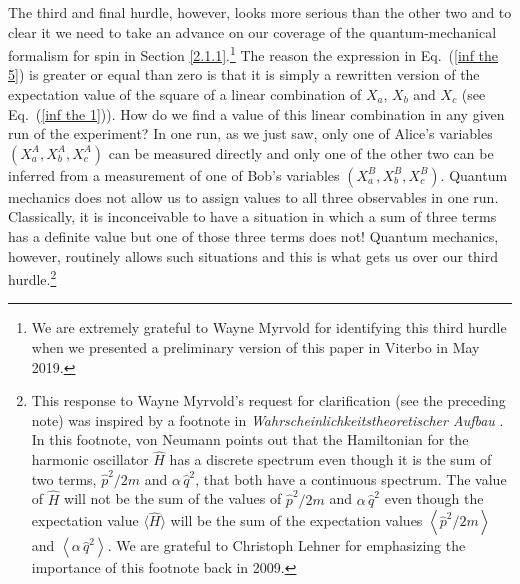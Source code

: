 The third and final hurdle, however, looks more serious than the other two and to clear it we need to take an advance on our coverage of  the quantum-mechanical formalism for spin in Section \ref{2.1.1}.\footnote{We are extremely grateful to Wayne Myrvold for identifying this third hurdle when we presented a preliminary version of this paper in Viterbo in May 2019.\label{Myrvold 1}} 
The reason the expression in Eq.\ (\ref{inf the 5}) is greater or equal than zero is that it is simply a rewritten version of the expectation value of the square of a linear combination of $X_a$, $X_b$ and $X_c$ (see Eq.\ (\ref{inf the 1})). How do we find a value of this linear combination in any given run of the experiment? In one run, as we just saw,
only one of Alice's variables  $(X_a^A, X_b^A, X_c^A)$ can be measured directly and only one of the other two can be inferred from a measurement of one of Bob's variables $(X_a^B, X_b^B, X_c^B)$. Quantum mechanics does not allow us to assign values to all three observables in one run. Classically, it is inconceivable to have a situation in which a sum of three terms has a definite value but one of those three terms does not! Quantum mechanics, however, routinely allows such situations and this is what gets us over our third hurdle.\footnote{This response to Wayne Myrvold's request for clarification (see the preceding note) was inspired by a footnote in \emph{Wahrscheinlichkeitstheoretischer Aufbau} 
\citep[p.\ 249, note 9]{von Neumann 1927b}. 
In this footnote, von Neumann points out that the Hamiltonian for the harmonic oscillator $\hat{H}$ has a discrete spectrum even though it is the sum of two terms, $\hat{p}^2/2m$ and $\alpha \, \hat{q}^2$, that both have a continuous spectrum. The value of  $\hat{H}$ will not be the sum of the values of $\hat{p}^2/2m$ and $\alpha \, \hat{q}^2$ even though the expectation value $\big\langle \hat{H} \big\rangle$ will be the sum of the expectation values $\left\langle \hat{p}^2/2m \right\rangle$ and $\left\langle \alpha \, \hat{q}^2 \right\rangle$. We are grateful to Christoph Lehner for emphasizing the importance of this footnote back in 2009.\label{Myrvold 2}}  

